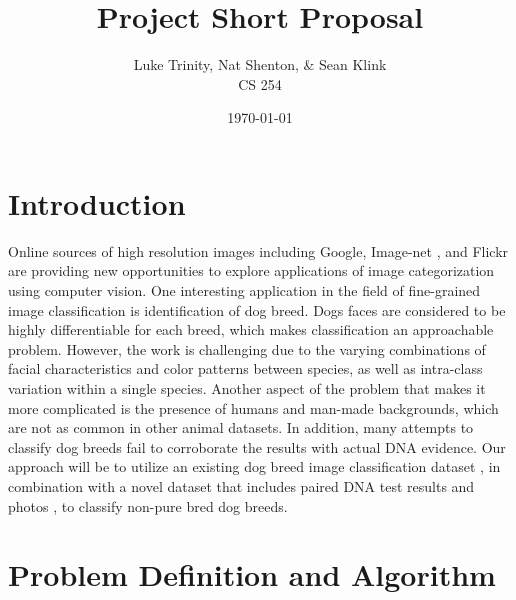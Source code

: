 \documentclass{article}
\title{Project Short Proposal}
\date{\today}
\author{Luke Trinity, Nat Shenton, \& Sean Klink \\  CS 254}
\begin{document}
 
\maketitle
\section{Introduction}

Online sources of high resolution images including Google, Image-net \cite{deng2009imagenet}, and Flickr are providing new opportunities to explore applications of image categorization using computer vision. One interesting application in the field of fine-grained image classification is identification of dog breed. Dogs faces are considered to be highly differentiable for each breed, which makes classification an approachable problem.  However, the work is challenging due to the varying combinations of facial characteristics and color patterns between species, as well as intra-class variation within a single species. Another aspect of the problem that makes it more complicated is the presence of humans and man-made backgrounds, which are not as common in other animal datasets. In addition, many attempts to classify dog breeds fail to corroborate the results with actual DNA evidence. Our approach will be to utilize an existing dog breed image classification dataset \cite{khosla2011novel}, in combination with a novel dataset that includes paired DNA test results and photos \cite{voith2009comparison}, to  classify non-pure bred dog breeds. 

\section{Problem Definition and Algorithm}
\end{document}
